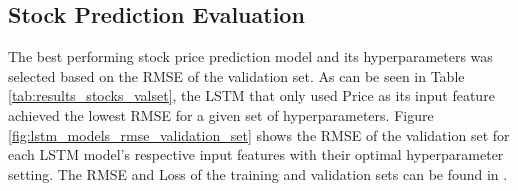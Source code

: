 \documentclass[11pt, a4paper]{article}
\begin{document}
\begin{table}[!ht]
    \caption{Test Set Macro Average Evaluation Metrics}
    \label{tab:results}
    \centering
    \small
\end{table}
\newpage
\subsection{Stock Prediction Evaluation}
The best performing stock price prediction model and its hyperparameters was selected based on the RMSE of the validation set. As can be seen
in Table \ref{tab:results_stocks_valset}, the LSTM that only used Price as its input feature achieved the lowest RMSE for a given set of hyperparameters.
Figure \ref{fig:lstm_models_rmse_validation_set} shows the RMSE of the validation set for each LSTM model's respective input features with their optimal hyperparameter setting.
The RMSE and Loss of the training and validation sets can be found in .
\end{document}

